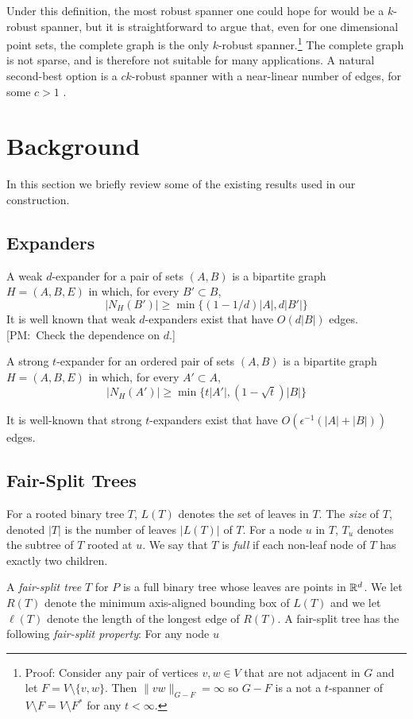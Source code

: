 \documentclass{patmorin}
\newcommand{\note}[2]{{\color{red}[#1:~#2]}}
\begin{document}
Under this definition, the most robust spanner one could hope for
would be a $k$-robust spanner, but it is straightforward to argue
that, even for one dimensional point sets, the complete graph is the
only $k$-robust spanner.\footnote{Proof: Consider any pair of vertices
$v,w\in V$ that are not adjacent in $G$ and let $F=V\setminus\{v,w\}$.
Then $\|vw\|_{G-F}=\infty$ so $G-F$ is a not a $t$-spanner of $V\setminus
F=V\setminus F^*$ for any $t<\infty$.} The complete graph is not sparse,
and is therefore not suitable for many applications. A natural second-best
option is a $ck$-robust spanner with a near-linear number of edges,
for some $c>1$ .

\section{Background}

In this section we briefly review some of the existing results used in
our construction.

\subsection{Expanders}
A weak $d$-expander for a pair of sets $(A,B)$ is a bipartite graph
$H=(A,B,E)$ in which, for every $B'\subset B$,
\[
	|N_H(B')| \ge \min\{(1-1/d)|A|, d|B'|\}
\]
It is well known that weak $d$-expanders exist that have $O(d|B|)$ edges.\note{PM}{Check the dependence on $d$.}

A strong $t$-expander for an ordered pair of sets $(A,B)$ is a bipartite graph $H=(A,B,E)$ in which, for every $A'\subset A$,
\[
	|N_H(A')| \ge \min\{t|A'|,(1-\sqrt{t})|B|\}
\]

It is well-known that strong $t$-expanders exist that have $O(\epsilon^{-1}(|A|+|B|))$
edges.

\subsection{Fair-Split Trees}

For a rooted binary tree $T$, $L(T)$ denotes the set of leaves in $T$. The
\emph{size} of $T$, denoted $|T|$ is the number of leaves $|L(T)|$
of $T$. For a node $u$ in $T$, $T_u$ denotes the subtree of $T$ rooted
at $u$.  We say that $T$ is \emph{full} if each non-leaf node of $T$
has exactly two children.

A \emph{fair-split tree} $T$ for $P$ is a full binary tree whose leaves
are points in $\mathbb{R}^d$.  We let $R(T)$ denote the minimum axis-aligned bounding
box of $L(T)$ and we let $\ell(T)$ denote the length of the longest edge of $R(T)$.  A fair-split tree has the following \emph{fair-split property}: For any node $u$
\end{document}
